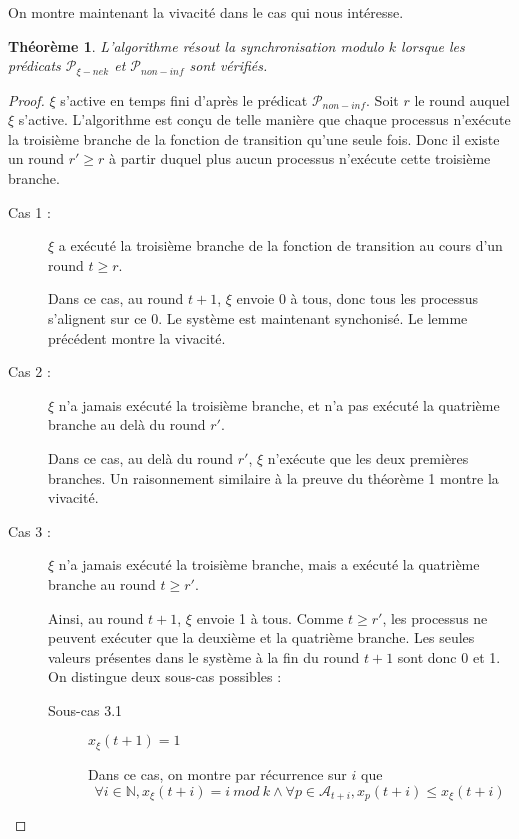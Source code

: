 \documentclass{article}
\newtheorem{theorem}{Théorème}
\begin{document}
On montre maintenant la vivacité dans le cas qui nous intéresse.

\begin{theorem}
	L'algorithme résout la synchronisation modulo $k$ lorsque les prédicats $\mathcal{P}_{\xi-nek}$ et $\mathcal{P}_{non-inf}$ sont vérifiés.
\end{theorem}
\begin{proof}
	$\xi$ s'active en temps fini d'après le prédicat $\mathcal{P}_{non-inf}$.
	Soit $r$ le round auquel $\xi$ s'active.
	L'algorithme est conçu de telle manière que chaque processus n'exécute la troisième branche de la fonction de transition qu'une seule fois.
	Donc il existe un round $r' \geq r$ à partir duquel plus aucun processus n'exécute cette troisième branche.

	\begin{description}

		\item[Cas 1 : ] $\xi$ a exécuté la troisième branche de la fonction de transition au cours d'un round $t \geq r$.

			Dans ce cas, au round $t+1$, $\xi$ envoie 0 à tous, donc tous les processus s'alignent sur ce 0. Le système est maintenant synchonisé. Le lemme précédent montre la vivacité.

		\item[Cas 2 : ] $\xi$ n'a jamais exécuté la troisième branche, et n'a pas exécuté la quatrième branche au delà du round $r'$.

			Dans ce cas, au delà du round $r'$, $\xi$ n'exécute que les deux premières branches. Un raisonnement similaire à la preuve du théorème 1 montre la vivacité.

		\item[Cas 3 : ] $\xi$ n'a jamais exécuté la troisième branche, mais a exécuté la quatrième branche au round $t \geq r'$.

			Ainsi, au round $t+1$, $\xi$ envoie 1 à tous. Comme $t \geq r'$, les processus ne peuvent exécuter que la deuxième et la quatrième branche.
			Les seules valeurs présentes dans le système à la fin du round $t+1$ sont donc 0 et 1.
			On distingue deux sous-cas possibles :

			\begin{description}

				\item[Sous-cas 3.1] $x_\xi(t+1) = 1$

					Dans ce cas, on montre par récurrence sur $i$ que
					$$\forall i \in \mathds{N}, x_\xi(t+i) = i~mod~k \wedge \forall p \in \mathcal{A}_{t+i}, x_p(t+i) \leq x_\xi(t+i)$$


\end{description}
\end{description}
\end{proof}
\end{document}
